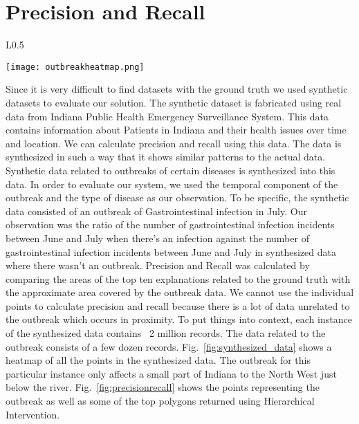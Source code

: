 \section{Precision and Recall}
\begin{wrapfigure}{L}{0.5\textwidth}
  \begin{center}
    \texttt{[image: outbreakheatmap.png]}
  \end{center}
  \caption{A heatmap showing sythesized data}
  \label{fig:synthesized_data}
\end{wrapfigure}

Since it is very difficult to find datasets with the ground truth we used synthetic datasets to evaluate our solution\citep{maciejewski2009generating}. The synthetic dataset is fabricated using real data from Indiana Public Health Emergency Surveillance System. This data contains information about Patients in Indiana and their health issues over time and location. We can calculate precision and recall using this data\citep{powers2011evaluation}. The data is synthesized in such a way that it shows similar patterns to the actual data. Synthetic data related to outbreaks of certain diseases is synthesized into this data. In order to evaluate our system, we used the temporal component of the outbreak and the type of disease as our observation. To be specific, the synthetic data consisted of an outbreak of Gastrointestinal infection in July. Our observation was the ratio of the number of gastrointestinal infection incidents between June and July when there's an infection against the number of gastrointestinal infection incidents between June and July in synthesized data where there wasn't an outbreak. Precision and Recall was calculated by comparing the areas of the top ten explanations related to the ground truth with the approximate area covered by the outbreak data. We cannot use the individual points to calculate precision and recall because there is a lot of data unrelated to the outbreak which occurs in proximity. To put things into context, each instance of the synthesized data contains ~2 million records. The data related to the outbreak consists of a few dozen records. Fig.~\ref{fig:synthesized_data} shows a heatmap of all the points in the synthesized data. The outbreak for this particular instance only affects a small part of Indiana to the North West just below the river. Fig.~\ref{fig:precisionrecall} shows the points representing the outbreak as well as some of the top polygons returned using Hierarchical Intervention.

